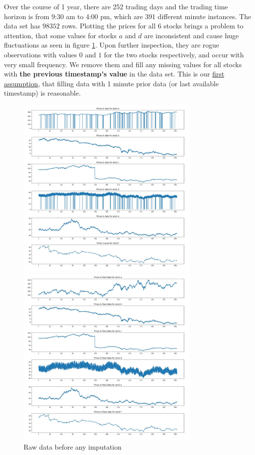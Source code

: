 \documentclass{article}
\begin{document}
Over the course of 1 year, there are 252 trading days and the trading time horizon is from 9:30 am to 4:00 pm, which are 391 different minute instances. The data set has $98352$ rows. Plotting the prices for all 6 stocks brings a problem to attention, that some values for stocks $a$ and $d$ are inconsistent and cause huge fluctuations as seen in figure \ref{fig1}. Upon further inspection, they are rogue observations with values $0$ and $1$ for the two stocks respectively, and occur with very small frequency. We remove them and fill any missing values for all stocks with \textbf{the previous timestamp's value} in the data set. This is our \underline{first assumption}, that filling data with 1 minute prior data (or last available timestamp) is reasonable.

\begin{figure}[htb]
	\begin{minipage}{0.5\textwidth}
		\centering
		\includegraphics[width=0.8\textwidth, height=0.8\textwidth]{raw_data.jpg}
		\caption{Raw data before any imputation}
		\label{fig1}
	\end{minipage}
	\begin{minipage}{0.5\textwidth}
		\includegraphics[width=0.8\textwidth, height=0.8\textwidth]{fixed_data.jpg}

\end{minipage}
\end{figure}
\end{document}
